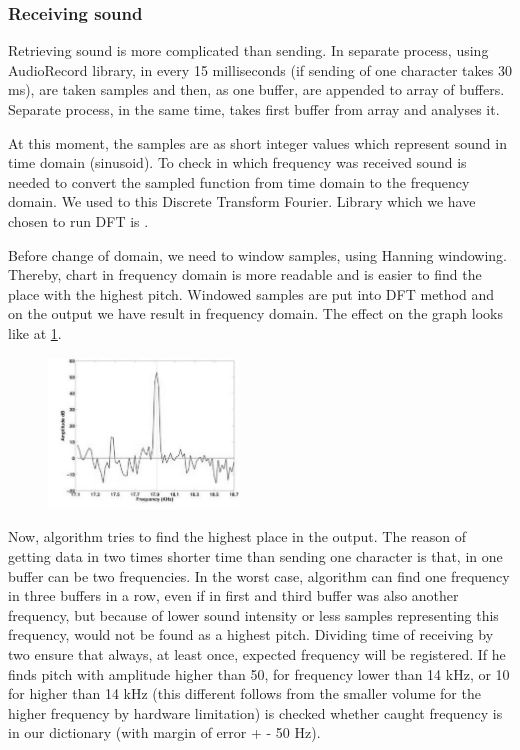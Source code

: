 \documentclass[11pt,titlepage]{article}
\theoremstyle{plain}
\begin{document}
\subsubsection{Receiving sound}

Retrieving sound is more complicated than sending. In separate process, using AudioRecord library, in every 15 milliseconds (if sending of one character takes 30 ms), are taken samples and then, as one buffer, are appended to array of buffers. Separate process, in the same time, takes first buffer from array and analyses it. 

\vspace{5mm}

At this moment, the samples are as short integer values which represent sound in time domain (sinusoid). To check in which frequency was received sound is needed to convert the sampled function from time domain to the frequency domain. We used to this Discrete Transform Fourier. Library which we have chosen to run DFT is \cite{minim_dft}. 

\vspace{5mm}

Before change of domain, we need to window samples, using Hanning windowing. Thereby, chart in frequency domain is more readable and is easier to find the place with the highest pitch. Windowed samples are put into DFT method and on the output we have result in frequency domain. The effect on the graph looks like at \ref{fig:F2}.


\begin{figure}[H]
	\centering
	\includegraphics[width=0.45\textwidth]{img/peaks_1}
	\label{fig:F2}
\end{figure}



Now, algorithm tries to find the highest place in the output. The reason of getting data in two times shorter time than sending one character is that, in one buffer can be two frequencies. In the worst case, algorithm can find one frequency in three buffers in a row, even if in first and third buffer was also another frequency, but because of lower sound intensity or less samples representing this frequency, would not be found as a highest pitch. Dividing time of receiving by two ensure that always, at least once, expected frequency will be registered. If he finds pitch with amplitude higher than 50, for frequency lower than 14 kHz, or 10 for higher than 14 kHz (this different follows from the smaller volume for the higher frequency by hardware limitation) is checked whether caught frequency is in our dictionary (with margin of error + - 50 Hz). 
\end{document}
